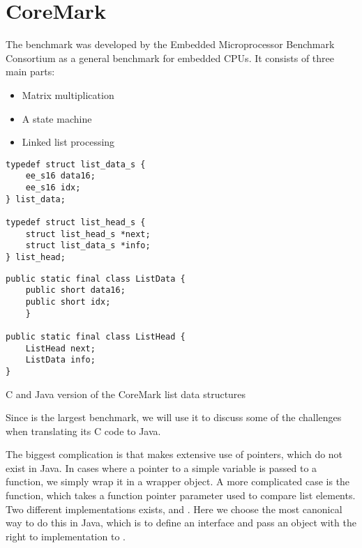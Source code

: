 \section{CoreMark}
\label{sec-evaluation-coremark}

The  benchmark was developed by the Embedded Microprocessor Benchmark Consortium as a general benchmark for embedded CPUs. It consists of three main parts:
\begin{itemize}
  \item Matrix multiplication
  \item A state machine
  \item Linked list processing
\end{itemize}

\begin{listing}[b]
\centering
\begin{minipage}[t]{0.48\textwidth}
\centering
\begin{verbatim}
typedef struct list_data_s {
    ee_s16 data16;
    ee_s16 idx;
} list_data;

typedef struct list_head_s {
    struct list_head_s *next;
    struct list_data_s *info;
} list_head;
\end{verbatim}
\end{minipage}\hfill
\begin{minipage}[t]{0.48\textwidth}
\centering
\begin{verbatim}
public static final class ListData {
    public short data16;
    public short idx;
    }

public static final class ListHead {
    ListHead next;
    ListData info;
}
\end{verbatim}
\end{minipage}
\caption{C and Java version of the CoreMark list data structures}
\label{lst-coremark-list-data-structures}
\end{listing}

Since  is the largest benchmark, we will use it to discuss some of the challenges when translating its C code to Java.

The biggest complication is that  makes extensive use of pointers, which do not exist in Java. In cases where a pointer to a simple variable is passed to a function, we simply wrap it in a wrapper object. A more complicated case is the  function, which takes a function pointer parameter  used to compare list elements. Two different implementations exists,  and . Here we choose the most canonical way to do this in Java, which is to define an interface and pass an object with the right to implementation to .

